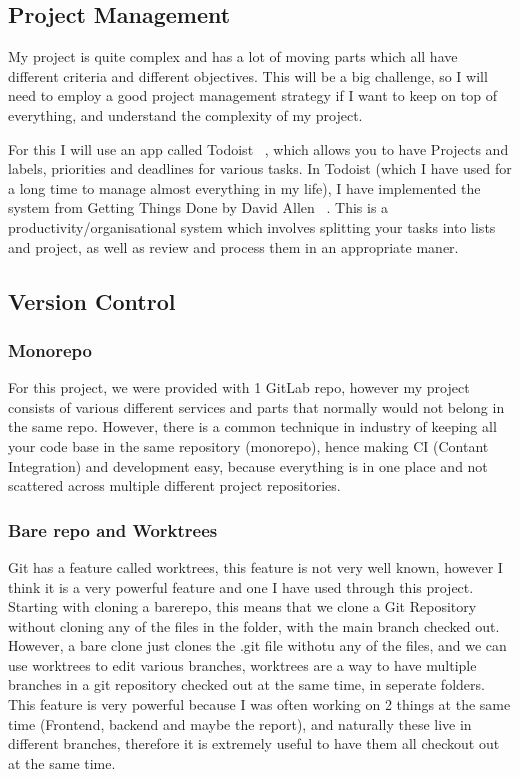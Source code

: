 \documentclass[titlepage]{article}
\begin{document}
\subsection{Project Management}
My project is quite complex and has a lot of moving parts which all have different criteria and different objectives. This will be a big challenge, so I will need to employ a good project management strategy if I want to keep on top of everything, and understand the complexity of my project.

For this I will use an app called Todoist ~\cite{todoist}, which allows you to have Projects and labels, priorities and deadlines for various tasks. In Todoist (which I have used for a long time to manage almost everything in my life), I have implemented the system from Getting Things Done by David Allen ~\cite{gtd}. This is a productivity/organisational system which involves splitting your tasks into lists and project, as well as review and process them in an appropriate maner.

\subsection{Version Control}

\subsubsection{Monorepo}
For this project, we were provided with 1 GitLab repo, however my project consists of various different services and parts that normally would not belong in the same repo. However, there is a common technique in industry of keeping all your code base in the same repository (monorepo), hence making CI (Contant Integration) and development easy, because everything is in one place and not scattered across multiple different project repositories. 

\subsubsection{Bare repo and Worktrees}
Git has a feature called worktrees, this feature is not very well known, however I think it is a very powerful feature and one I have used through this project. Starting with cloning a barerepo, this means that we clone a Git Repository without cloning any of the files in the folder, with the main branch checked out. However, a bare clone just clones the .git file withotu any of the files, and we can use worktrees to edit various branches, worktrees are a way to have multiple branches in a git repository checked out at the same time, in seperate folders. This feature is very powerful because I was often working on 2 things at the same time (Frontend, backend and maybe the report), and naturally these live in different branches, therefore it is extremely useful to have them all checkout out at the same time. 
\end{document}
